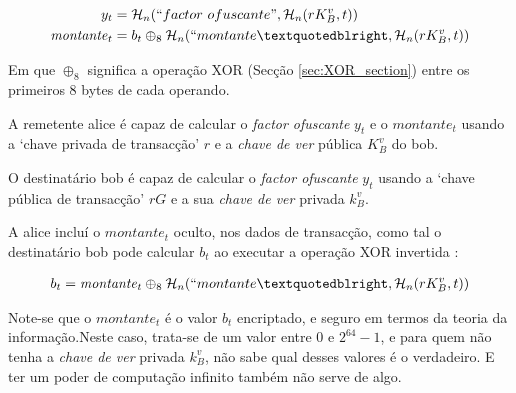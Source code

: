 \vspace{.175cm}%
\begin{align*}
  y_t &= \mathcal{H}_n(``factor\ ofuscante",\mathcal{H}_n(r K_B^v, t)) \\
  \mathit{montante}_t &= b_t \oplus_8 \mathcal{H}_n(``montante”, \mathcal{H}_n(r K_B^v, t))
\end{align*}

Em que $\oplus_8$ significa a operação XOR (Secção \ref{sec:XOR_section}) entre os primeiros 8 bytes de cada operando.\newline

A remetente alice é capaz de calcular o {\em factor ofuscante} $y_t$ e o $montante_t$ usando a `chave privada de transacção' $r$ e a {\em chave de ver} pública $K_B^v$ do bob. 

O destinatário bob é capaz de calcular o {\em factor ofuscante} $y_t$ usando a `chave pública de transacção' $r G$ e a sua {\em chave de ver} privada $k_B^v$. 

A alice incluí o $\mathit{montante}_t$ oculto, nos dados de transacção, como tal o destinatário bob pode calcular $b_t$ ao executar a operação XOR invertida :

\begin{align*}
b_t = \mathit{montante}_t \oplus_8 \mathcal{H}_n(``montante”, \mathcal{H}_n(r K_B^v, t))
\end{align*}

Note-se que o $\mathit{montante}_t$ é o valor $b_t$ encriptado, e seguro em termos da teoria da informação.\newline Neste caso, trata-se de um valor entre 0 e $2^{64}-1$, e para quem não tenha a {\em chave de ver} privada $k_B^v$, não sabe qual desses valores é o verdadeiro. E ter um poder de computação infinito também não serve de algo.   



